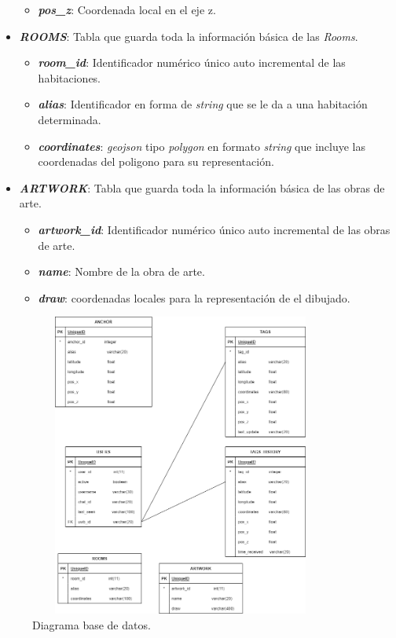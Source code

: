 \begin{itemize}
\begin{itemize}
                \item \textit{\textbf{pos\_z}}: Coordenada local en el eje z.
            \end{itemize}
    \item \textit{\textbf{ROOMS}}: Tabla que guarda toda la información básica de las \textit{Rooms}.
            \begin{itemize}
                \item \textit{\textbf{room\_id}}: Identificador numérico único auto incremental de las habitaciones.
                \item \textit{\textbf{alias}}: Identificador en forma de \textit{string} que se le da a una habitación determinada.
                \item \textit{\textbf{coordinates}}: \textit{geojson} tipo \textit{polygon} en formato \textit{string} que incluye las coordenadas del poligono para su representación.
            \end{itemize}
    \item \textit{\textbf{ARTWORK}}: Tabla que guarda toda la información básica de las obras de arte.
            \begin{itemize}
                \item \textit{\textbf{artwork\_id}}: Identificador numérico único auto incremental de las obras de arte.
                \item \textit{\textbf{name}}: Nombre de la obra de arte.
                \item \textit{\textbf{draw}}: coordenadas locales para la representación de el dibujado.
            \end{itemize}
\end{itemize}
\FloatBarrier
\begin{figure}[h]
    \centering
    \includegraphics[width=10cm,height=10cm,keepaspectratio]{img/DB COLOSSEUM.drawio.png}
    \caption{Diagrama base de datos.}
    \label{fig:diagram_db}
\end{figure}
\FloatBarrier


